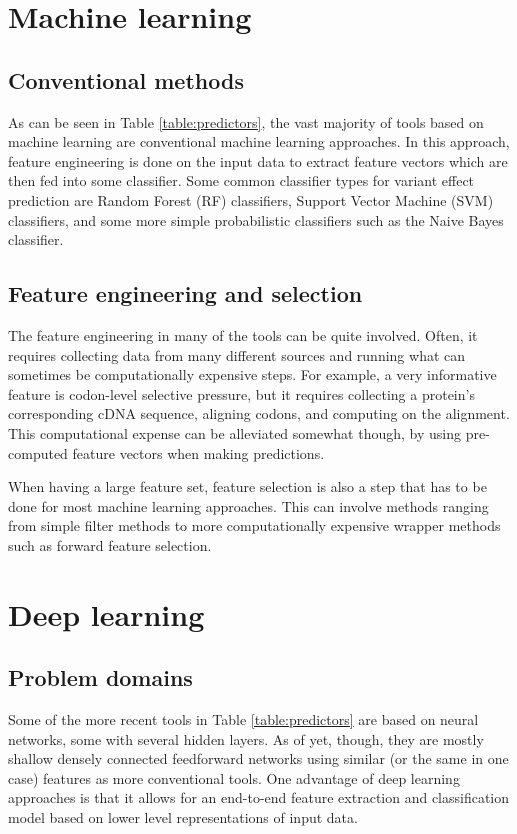 \section{Machine learning}

\subsection{Conventional methods}
As can be seen in Table \ref{table:predictors}, the vast majority of tools based on machine learning are conventional machine learning approaches. In this approach, feature engineering is done on the input data to extract feature vectors which are then fed into some classifier. Some common classifier types for variant effect prediction are Random Forest (RF) classifiers, Support Vector Machine (SVM) classifiers, and some more simple probabilistic classifiers such as the Naive Bayes classifier.

\subsection{Feature engineering and selection}
The feature engineering in many of the tools can be quite involved. Often, it requires collecting data from many different sources and running what can sometimes be computationally expensive steps. For example, a very informative feature is codon-level selective pressure\cite{niroula2015classification}, but it requires collecting a protein's corresponding cDNA sequence, aligning codons, and computing on the alignment. This computational expense can be alleviated somewhat though, by using pre-computed feature vectors when making predictions.

When having a large feature set, feature selection is also a step that has to be done for most machine learning approaches. This can involve methods ranging from simple filter methods to more computationally expensive wrapper methods such as forward feature selection.

\section{Deep learning}

\subsection{Problem domains}

Some of the more recent tools in Table \ref{table:predictors} are based on neural networks, some with several hidden layers. As of yet, though, they are mostly shallow densely connected feedforward networks using similar (or the same in one case) features as more conventional tools. One advantage of deep learning approaches is that it allows for an end-to-end feature extraction and classification model based on lower level representations of input data.

